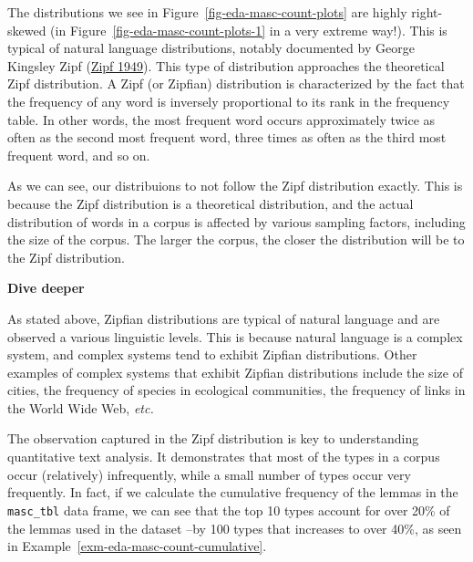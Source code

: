 \documentclass[
  letterpaper,
  DIV=11,
  numbers=noendperiod]{scrreport}
\theoremstyle{definition}
\theoremstyle{remark}
\begin{document}
The distributions we see in Figure~\ref{fig-eda-masc-count-plots} are
highly right-skewed (in Figure~\ref{fig-eda-masc-count-plots-1} in a
very extreme way!). This is typical of natural language distributions,
notably documented by George Kingsley Zipf
(\protect\hyperlink{ref-Zipf1949}{Zipf 1949}). This type of distribution
approaches the theoretical Zipf distribution. A Zipf (or Zipfian)
distribution is characterized by the fact that the frequency of any word
is inversely proportional to its rank in the frequency table. In other
words, the most frequent word occurs approximately twice as often as the
second most frequent word, three times as often as the third most
frequent word, and so on.

As we can see, our distribuions to not follow the Zipf distribution
exactly. This is because the Zipf distribution is a theoretical
distribution, and the actual distribution of words in a corpus is
affected by various sampling factors, including the size of the corpus.
The larger the corpus, the closer the distribution will be to the Zipf
distribution.

\begin{tcolorbox}[enhanced jigsaw, leftrule=.75mm, bottomrule=.15mm, opacityback=0, breakable, left=2mm, colback=white, toprule=.15mm, arc=.35mm, rightrule=.15mm]

\textbf{ Dive deeper}

As stated above, Zipfian distributions are typical of natural language
and are observed a various linguistic levels. This is because natural
language is a complex system, and complex systems tend to exhibit
Zipfian distributions. Other examples of complex systems that exhibit
Zipfian distributions include the size of cities, the frequency of
species in ecological communities, the frequency of links in the World
Wide Web, \emph{etc.}

\end{tcolorbox}

The observation captured in the Zipf distribution is key to
understanding quantitative text analysis. It demonstrates that most of
the types in a corpus occur (relatively) infrequently, while a small
number of types occur very frequently. In fact, if we calculate the
cumulative frequency of the lemmas in the \texttt{masc\_tbl} data frame,
we can see that the top 10 types account for over 20\% of the lemmas
used in the dataset --by 100 types that increases to over 40\%, as seen
in Example~\ref{exm-eda-masc-count-cumulative}.
\end{document}
